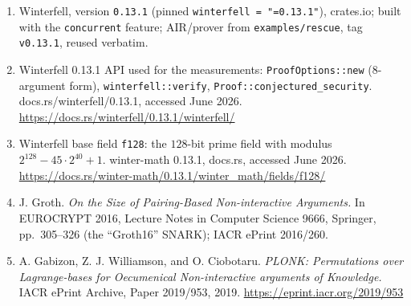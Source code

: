 \documentclass[11pt]{article}
\begin{document}
\begin{enumerate}
11693, Springer; IACR ePrint 2019/190.
\item[{[11]}] Winterfell, version \texttt{0.13.1} (pinned \texttt{winterfell = "=0.13.1"}), crates.io;
built with the \texttt{concurrent} feature; AIR/prover from \texttt{examples/rescue}, tag
\texttt{v0.13.1}, reused verbatim.
\item[{[12]}] Winterfell 0.13.1 API used for the measurements: \texttt{ProofOptions::new} (8-argument
form), \texttt{winterfell::verify}, \texttt{Proof::conjectured\_security}. docs.rs/winterfell/0.13.1,
accessed June 2026. \url{https://docs.rs/winterfell/0.13.1/winterfell/}
\item[{[13]}] Winterfell base field \texttt{f128}: the $128$-bit prime field with modulus
$2^{128}-45\cdot2^{40}+1$. winter-math 0.13.1, docs.rs, accessed June 2026.
\url{https://docs.rs/winter-math/0.13.1/winter_math/fields/f128/}
\item[{[14]}] J. Groth. \emph{On the Size of Pairing-Based Non-interactive Arguments.} In EUROCRYPT 2016,
Lecture Notes in Computer Science 9666, Springer, pp.\ 305--326 (the ``Groth16'' SNARK); IACR ePrint 2016/260.
\item[{[15]}] A. Gabizon, Z. J. Williamson, and O. Ciobotaru. \emph{PLONK: Permutations over Lagrange-bases
for Oecumenical Non-interactive arguments of Knowledge.} IACR ePrint Archive, Paper 2019/953, 2019.
\url{https://eprint.iacr.org/2019/953}
\end{enumerate}
\end{document}
